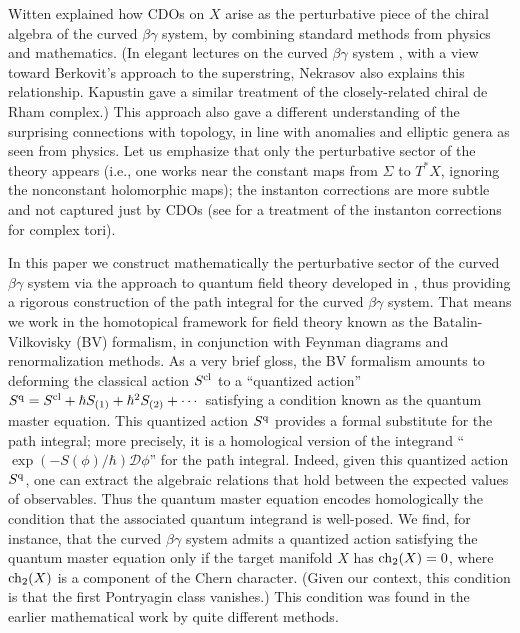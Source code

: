 Witten \cite{WittenCDO} explained how CDOs on $X$ arise as the perturbative piece of the chiral algebra of the curved $\beta\gamma$ system, by combining standard methods from physics and mathematics. (In elegant lectures on the curved $\beta\gamma$ system \cite{Nek}, with a view toward Berkovit's approach to the superstring, Nekrasov also explains this relationship.  Kapustin \cite{KapCDR} gave a similar treatment of the closely-related chiral de Rham complex.) This approach also gave a different understanding of the surprising connections with topology, in line with anomalies and elliptic genera as seen from physics. Let us emphasize that only the perturbative sector of the theory appears (i.e., one works near the constant maps from $\Sigma$ to $T^*X$, ignoring the nonconstant holomorphic maps); the instanton corrections are more subtle and not captured just by CDOs (see \cite{KapOrlov} for a treatment of the instanton corrections for complex tori).

In this paper we construct mathematically the perturbative sector of the curved $\beta\gamma$ system via the approach to quantum field theory developed in \cite{CosBook, CG}, thus providing a rigorous construction of the path integral for the curved $\beta\gamma$ system. That means we work in the homotopical framework for field theory known as the Batalin-Vilkovisky (BV) formalism, in conjunction with Feynman diagrams and renormalization methods. As a very brief gloss, the BV formalism amounts to deforming the classical action $S^{\rm cl}$ to a ``quantized action'' $S^{\rm q} = S^{\rm cl} + \hbar S_{(1)} + \hbar^2 S_{(2)} + \cdots$ satisfying a condition known as the quantum master equation. This quantized action $S^{\rm q}$ provides a formal substitute for the path integral; more precisely, it is a homological version of the integrand ``$\exp(-S(\phi)/\hbar) \mathcal{D}\phi$'' for the path integral. Indeed, given this quantized action $S^{\rm q}$, one can extract the algebraic relations that hold between the expected values of observables. Thus the quantum master equation encodes homologically the condition that the associated quantum integrand is well-posed. We find, for instance, that the curved $\beta\gamma$ system admits a quantized action satisfying the quantum master equation only if the target manifold $X$ has ${\rm ch}_2(X) = 0$, where ${\rm ch}_2(X)$ is a component of the Chern character. (Given our context, this condition is that the first Pontryagin class vanishes.) This condition was found in the earlier mathematical work by quite different methods.

